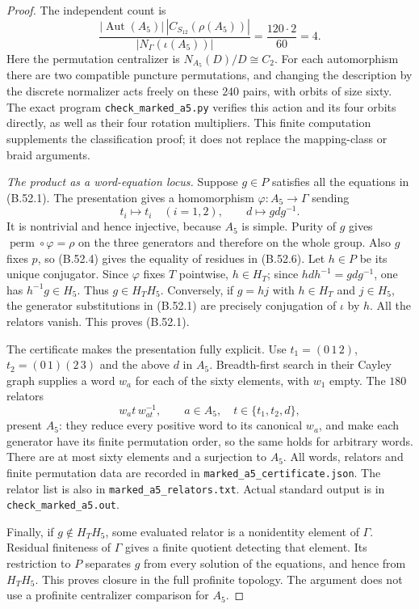\begin{proof}
The independent count is
\[
 \frac{|\operatorname{Aut}(A_5)|\,
        |C_{S_{12}}(\rho(A_5))|}
      {|N_\Gamma(\iota(A_5))|}
 =\frac{120\cdot2}{60}=4.
\]
Here the permutation centralizer is
$N_{A_5}(D)/D\cong C_2$.
For each automorphism there are two compatible puncture
permutations, and changing the description by the discrete
normalizer acts freely on these $240$ pairs, with orbits
of size sixty.  The exact program
\texttt{check\_marked\_a5.py} verifies this action and its
four orbits directly, as well as their four rotation
multipliers.  This finite computation supplements the
classification proof; it does not replace the mapping-class
or braid arguments.

\emph{The product as a word-equation locus.}
Suppose $g\in P$ satisfies all the equations in (B.52.1).
The presentation gives a homomorphism
$\varphi:A_5\to\Gamma$ sending
\[
 t_i\longmapsto t_i\quad(i=1,2),\qquad
 d\longmapsto gdg^{-1}.
\]
It is nontrivial and hence injective, because $A_5$ is simple.
Purity of $g$ gives
$\operatorname{perm}\circ\varphi=\rho$ on the three
generators and therefore on the whole group.
Also $g$ fixes $p$, so (B.52.4) gives the equality of
residues in (B.52.6).
Let $h\in P$ be its unique conjugator.
Since $\varphi$ fixes $T$ pointwise, $h\in H_T$;
since $hdh^{-1}=gdg^{-1}$, one has
$h^{-1}g\in H_5$.  Thus $g\in H_TH_5$.
Conversely, if $g=hj$ with $h\in H_T$ and $j\in H_5$,
the generator substitutions in (B.52.1) are precisely
conjugation of $\iota$ by $h$.  All the relators vanish.
This proves (B.52.1).

The certificate makes the presentation fully explicit.
Use $t_1=(0\,1\,2)$, $t_2=(0\,1)(2\,3)$ and the
above $d$ in $A_5$.  Breadth-first search in their Cayley
graph supplies a word $w_a$ for each of the sixty elements,
with $w_1$ empty.  The $180$ relators
\[
 w_a t\,w_{at}^{-1},
 \qquad a\in A_5,\quad t\in\{t_1,t_2,d\},
\]
present $A_5$: they reduce every positive word to its
canonical $w_a$, and make each generator have its finite
permutation order, so the same holds for arbitrary words.
There are at most sixty elements and a surjection to $A_5$.
All words, relators and finite permutation data are recorded
in \texttt{marked\_a5\_certificate.json}.
The relator list is also in \texttt{marked\_a5\_relators.txt}.
Actual standard output is in \texttt{check\_marked\_a5.out}.

Finally, if $g\notin H_TH_5$, some evaluated relator is
a nonidentity element of $\Gamma$.
Residual finiteness of $\Gamma$ gives a finite quotient
detecting that element.  Its restriction to $P$ separates
$g$ from every solution of the equations, and hence from
$H_TH_5$.  This proves closure in the full profinite
topology.  The argument does not use a profinite
centralizer comparison for $A_5$.


\end{proof}
